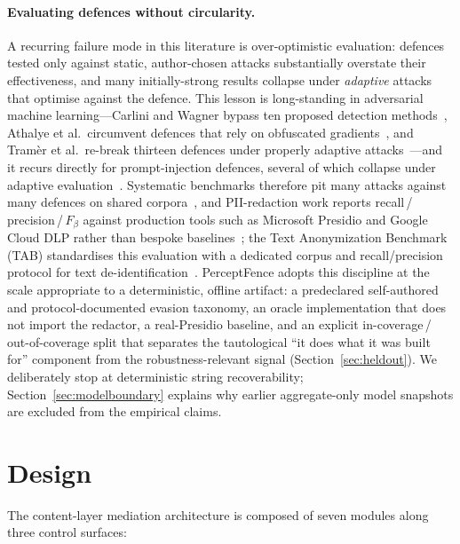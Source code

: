 \documentclass[pdflatex,sn-mathphys-num]{sn-jnl}
\begin{document}
\paragraph{Evaluating defences without circularity.}
A recurring failure mode in this literature is over-optimistic evaluation:
defences tested only against static, author-chosen attacks substantially
overstate their effectiveness, and many initially-strong results collapse under
\textit{adaptive} attacks that optimise against the defence. This lesson is
long-standing in adversarial machine learning---Carlini and Wagner bypass ten
proposed detection methods~\cite{carlini2017adversarial}, Athalye et al.\ circumvent defences that rely on obfuscated
gradients~\cite{athalye2018obfuscated}, and Tram\`er et al.\ re-break thirteen
defences under properly adaptive attacks~\cite{tramer2020adaptive}---and it
recurs directly for prompt-injection defences, several of which collapse under
adaptive evaluation~\cite{jia2025critical}.
Systematic benchmarks therefore pit many attacks against many defences on shared
corpora~\cite{liu2024formalizing}, and PII-redaction work reports
recall\,/\,precision\,/\,$F_\beta$ against production tools such as Microsoft
Presidio and Google Cloud DLP rather than bespoke baselines~\cite{albanese2023sanitization};
the Text Anonymization Benchmark (TAB) standardises this evaluation with a
dedicated corpus and recall/precision protocol for text
de-identification~\cite{pilan2022tab}.
PerceptFence adopts this discipline at the scale appropriate to a deterministic,
offline artifact: a predeclared self-authored and protocol-documented evasion
taxonomy, an oracle implementation that does not import the redactor, a
real-Presidio baseline, and an explicit
in-coverage\,/\,out-of-coverage split that separates the tautological
``it does what it was built for'' component from the robustness-relevant signal
(Section~\ref{sec:heldout}). We deliberately stop at deterministic string
recoverability; Section~\ref{sec:modelboundary} explains why earlier
aggregate-only model snapshots are excluded from the empirical claims.

\section{Design}\label{sec:design}

The content-layer mediation architecture is composed of seven modules along
three control surfaces:
\end{document}
